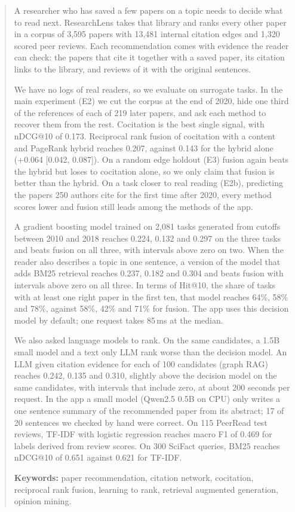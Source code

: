 \documentclass[11pt,a4paper]{article}
\begin{document}
\begin{abstract}
A researcher who has saved a few papers on a topic needs to decide what to read next. ResearchLens takes that library and ranks every other paper in a corpus of 3,595 papers with 13,481 internal citation edges and 1,320 scored peer reviews. Each recommendation comes with evidence the reader can check: the papers that cite it together with a saved paper, its citation links to the library, and reviews of it with the original sentences.

We have no logs of real readers, so we evaluate on surrogate tasks. In the main experiment (E2) we cut the corpus at the end of 2020, hide one third of the references of each of 219 later papers, and ask each method to recover them from the rest. Cocitation is the best single signal, with nDCG@10 of 0.173. Reciprocal rank fusion of cocitation with a content and PageRank hybrid reaches 0.207, against 0.143 for the hybrid alone (+0.064 [0.042, 0.087]). On a random edge holdout (E3) fusion again beats the hybrid but loses to cocitation alone, so we only claim that fusion is better than the hybrid. On a task closer to real reading (E2b), predicting the papers 250 authors cite for the first time after 2020, every method scores lower and fusion still leads among the methods of the app.

A gradient boosting model trained on 2,081 tasks generated from cutoffs between 2010 and 2018 reaches 0.224, 0.132 and 0.297 on the three tasks and beats fusion on all three, with intervals above zero on two. When the reader also describes a topic in one sentence, a version of the model that adds BM25 retrieval reaches 0.237, 0.182 and 0.304 and beats fusion with intervals above zero on all three. In terms of Hit@10, the share of tasks with at least one right paper in the first ten, that model reaches 64\%, 58\% and 78\%, against 58\%, 42\% and 71\% for fusion. The app uses this decision model by default; one request takes 85\,ms at the median.

We also asked language models to rank. On the same candidates, a 1.5B small model and a text only LLM rank worse than the decision model. An LLM given citation evidence for each of 100 candidates (graph RAG) reaches 0.242, 0.135 and 0.310, slightly above the decision model on the same candidates, with intervals that include zero, at about 200 seconds per request. In the app a small model (Qwen2.5 0.5B on CPU) only writes a one sentence summary of the recommended paper from its abstract; 17 of 20 sentences we checked by hand were correct. On 115 PeerRead test reviews, TF-IDF with logistic regression reaches macro F1 of 0.469 for labels derived from review scores. On 300 SciFact queries, BM25 reaches nDCG@10 of 0.651 against 0.621 for TF-IDF.

\medskip\noindent\textbf{Keywords:} paper recommendation, citation network, cocitation, reciprocal rank fusion, learning to rank, retrieval augmented generation, opinion mining.
\end{abstract}
\end{document}
